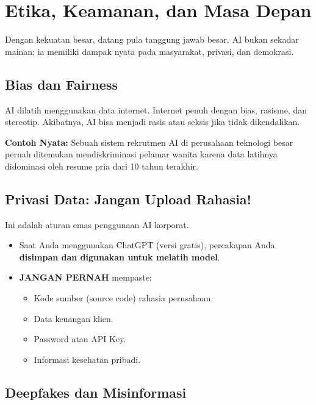 \chapter{Etika, Keamanan, dan Masa Depan}
\label{chap:ethics}

Dengan kekuatan besar, datang pula tanggung jawab besar. AI bukan sekadar mainan; ia memiliki dampak nyata pada masyarakat, privasi, dan demokrasi.

\section{Bias dan Fairness}

AI dilatih menggunakan data internet. Internet penuh dengan bias, rasisme, dan stereotip. Akibatnya, AI bisa menjadi rasis atau seksis jika tidak dikendalikan.

\begin{tipbox}
\textbf{Contoh Nyata:}
Sebuah sistem rekrutmen AI di perusahaan teknologi besar pernah ditemukan mendiskriminasi pelamar wanita karena data latihnya didominasi oleh resume pria dari 10 tahun terakhir.
\end{tipbox}

\section{Privasi Data: Jangan Upload Rahasia!}

Ini adalah aturan emas penggunaan AI korporat.

\begin{itemize}
    \item Saat Anda menggunakan ChatGPT (versi gratis), percakapan Anda \textbf{disimpan dan digunakan untuk melatih model}.
    \item \textbf{JANGAN PERNAH} mempaste:
    \begin{itemize}
        \item Kode sumber (source code) rahasia perusahaan.
        \item Data keuangan klien.
        \item Password atau API Key.
        \item Informasi kesehatan pribadi.
    \end{itemize}
\end{itemize}

\section{Deepfakes dan Misinformasi}

